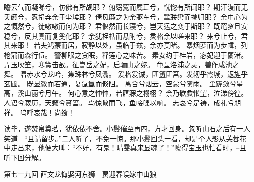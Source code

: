 \documentclass[12pt,oneside]{book}
\begin{document}
瞻云气而凝睇兮，仿佛有所觇耶？
俯窈窕而属耳兮，恍惚有所闻耶？
期汗漫而无夭阏兮，忍捐弃余于尘埃耶？
倩风廉之为余驱车兮，冀联辔而携归耶？
余中心为之慨然兮，徒嗷嗷而何为耶？
君偃然而长寝兮，岂天运之变于斯耶？
既窀穸且安稳兮，反其真而复奚化耶？
余犹桎梏而悬附兮，灵格余以嗟来耶？
来兮止兮，君其来耶！
若夫鸿蒙而居，寂静以处，虽临于兹，余亦莫睹。
搴烟萝而为步幛，列枪蒲而森行伍。
警柳眼之贪眠，释莲心之味苦。
素女约于桂岩，宓妃迎于蘭渚。
弄玉吹笙，寒簧击敔。征嵩岳之妃，启骊山之姥。
龟呈洛浦之灵，兽作咸池之舞。
潜赤水兮龙吟，集珠林兮凤翥。
爰格爰诚，匪簠匪筥。发轫乎霞城，返旌乎玄圃。
既显微而若通，复氤氲而倏阻。
离合兮烟云，空蒙兮雾雨。
尘霾敛兮星高，溪山丽兮月午。
何心意之忡忡，若寤寐之栩栩？
余乃欷歔怅望，泣涕傍徨。
人语兮寂历，天籁兮篔筜。
鸟惊散而飞，鱼唼喋以响。
志哀兮是祷，成礼兮期祥。
呜呼哀哉！尚飨！

读毕，遂焚帛奠茗，犹依依不舍。小鬟催至再四，方才回身。忽听山石之后有一人笑道：“且请留步。”二人听了，不免一惊。那小鬟回头一看，却是个人影从芙蓉花中走出来，他便大叫：“不好，有鬼！晴雯真来显魂了！”唬得宝玉也忙看时，--且听下回分解。
 
第七十九回  薛文龙悔娶河东狮　贾迎春误嫁中山狼
\end{document}
